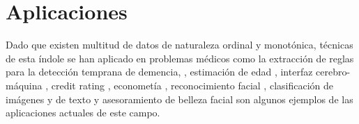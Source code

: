 \section{Aplicaciones}
Dado que existen multitud de datos de naturaleza ordinal y monotónica, técnicas de esta índole se han aplicado en problemas médicos \cite{bender1997ordinal} como la extracción de reglas para la detección temprana de demencia, \cite{pazzani2001acceptance}, estimación de edad \cite{chang2011ordinal}, interfaz cerebro-máquina \cite{yoon2011bayesian}, credit rating \cite{kwon1997ordinal}, econometía \cite{mathieson1996ordinal}, reconocimiento facial \cite{kim2010structured}, clasificación de imágenes \cite{tian2014comparative} y de texto \cite{baccianella2014feature} y asesoramiento de belleza facial \cite{yan2014cost} son algunos ejemplos de las aplicaciones actuales de este campo.
